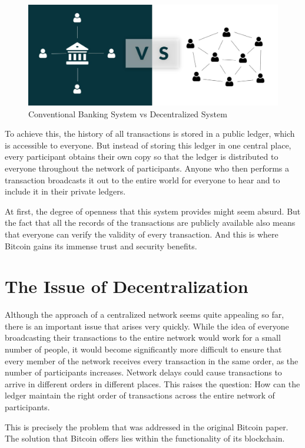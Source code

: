 \documentclass[a4paper, 12pt]{report}
\begin{document}
\begin{figure}[h]
	\includegraphics[width=\textwidth]{01_Decentralized}
	\caption{Conventional Banking System vs Decentralized System}
	\label{fig:01_Decentralized}
\end{figure}

\par To achieve this, the history of all transactions is stored in a public ledger, which is accessible to everyone. But instead of storing this ledger in one central place, every participant obtains their own copy so that the ledger is distributed to everyone throughout the network of participants. Anyone who then performs a transaction broadcasts it out to the entire world for everyone to hear and to include it in their private ledgers. 
\par At first, the degree of openness that this system provides might seem absurd. But the fact that all the records of the transactions are publicly available also means that everyone can verify the validity of every transaction. And this is where Bitcoin gains its immense trust and security benefits.

\section{The Issue of Decentralization}
\par Although the approach of a centralized network seems quite appealing so far, there is an important issue that arises very quickly. While the idea of everyone broadcasting their transactions to the entire network would work for a small number of people, it would become significantly more difficult to ensure that every member of the network receives every transaction in the same order, as the number of participants increases. Network delays could cause transactions to arrive in different orders in different places. This raises the question: How can the ledger maintain the right order of transactions across the entire network of participants. 
\par This is precisely the problem that was addressed in the original Bitcoin paper. The solution that Bitcoin offers lies within the functionality of its blockchain.
\end{document}
